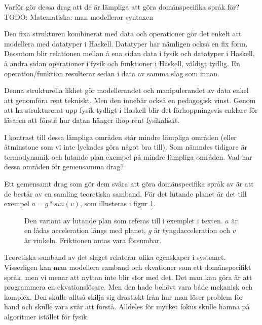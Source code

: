 \begin{binge}
Varför gör dessa drag att de är lämpliga att göra domänspecifika språk för? TODO: Matematiska: man modellerar syntaxen

Den fixa strukturen kombinerat med data och operationer gör det enkelt att modellera med datatyper i Haskell. Datatyper har nämligen också en fix form. Dessutom blir relationen mellan å ena sidan data i fysik och datatyper i Haskell, å andra sidan operationer i fysik och funktioner i Haskell, väldigt tydlig. En operation/funktion resulterar sedan i data av samma slag som innan.

Denna strukturella likhet gör modellerandet och manipulerandet av data enkel att genomföra rent tekniskt. Men den innebär också en pedagogisk vinst. Genom att ha strukturerat upp fysik tydligt i Haskell blir det förhoppningsvis enklare för läsaren att förstå hur datan hänger ihop rent fysikaliskt.

I kontrast till dessa lämpliga områden står mindre lämpliga områden (eller åtminstone som vi inte lyckades göra något bra till). Som nämndes tidigare är termodynamik och lutande plan exempel på mindre lämpliga områden. Vad har dessa områden för gemensamma drag?

Ett gemensamt drag som gör dem svåra att göra domänspecifika språk av är att de består av en samling teoretiska samband. För det lutande planet är det till exempel $a = g * sin(v)$, som illusteras i figur \ref{fig:lutande_plan}.

\begin{figure}[tph]
  \caption{Den variant av lutande plan som referas till i exemplet i texten. $a$ är en lådas acceleration längs med planet, $g$ är tyngdacceleration och $v$ är vinkeln. Friktionen antas vara försumbar.}
  \label{fig:lutande_plan}
\end{figure}

Teoretiska samband av det slaget relaterar olika egenskaper i systemet. Visserligen kan man modellera samband och ekvationer som ett domänspecifikt språk, men vi menar att nyttan inte blir stor med det. Det man kan göra är att programmera en ekvationslösare. Men den hade behövt vara både mekanisk och komplex. Den skulle alltså skilja sig drastiskt från hur man löser problem för hand och skulle vara svår att förstå. Alldeles för mycket fokus skulle hamna på algoritmer istället för fysik.


\end{binge}
